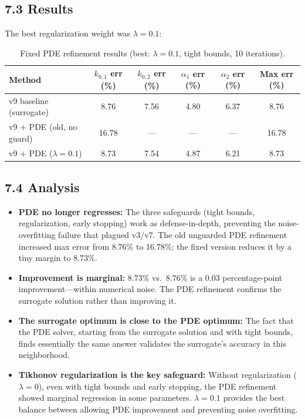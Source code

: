 \documentclass[11pt]{article}
\begin{document}
\subsection*{7.3 Results}

The best regularization weight was $\lambda = 0.1$:

\begin{table}[H]
  \centering
  \caption{Fixed PDE refinement results (best: $\lambda = 0.1$, tight bounds,
           10 iterations).}
  \label{tab:pde_fixed}
  \begin{tabular}{l S[round-precision=2] S[round-precision=2]
                    S[round-precision=2] S[round-precision=2]
                    S[round-precision=2]}
    \toprule
    Method & {$k_{0,1}$ err (\%)} & {$k_{0,2}$ err (\%)}
           & {$\alpha_1$ err (\%)} & {$\alpha_2$ err (\%)}
           & {Max err (\%)} \\
    \midrule
    v9 baseline (surrogate)  &  8.76 &  7.56 & 4.80 & 6.37 &  8.76 \\
    v9 + PDE (old, no guard) & 16.78 & {---} & {---} & {---} & 16.78 \\
    v9 + PDE ($\lambda = 0.1$) &  8.73 &  7.54 & 4.87 & 6.21 &  8.73 \\
    \bottomrule
  \end{tabular}
\end{table}

\subsection*{7.4 Analysis}

\begin{itemize}
  \item \textbf{PDE no longer regresses:} The three safeguards (tight bounds,
        regularization, early stopping) work as defense-in-depth, preventing
        the noise-overfitting failure that plagued v3/v7.  The old unguarded
        PDE refinement increased max error from 8.76\% to 16.78\%; the fixed
        version reduces it by a tiny margin to 8.73\%.

  \item \textbf{Improvement is marginal:} $8.73\%$ vs.\ $8.76\%$ is a
        0.03 percentage-point improvement---within numerical noise.  The PDE
        refinement confirms the surrogate solution rather than improving it.

  \item \textbf{The surrogate optimum is close to the PDE optimum:} The fact
        that the PDE solver, starting from the surrogate solution and with
        tight bounds, finds essentially the same answer validates the
        surrogate's accuracy in this neighborhood.

  \item \textbf{Tikhonov regularization is the key safeguard:} Without
        regularization ($\lambda = 0$), even with tight bounds and early
        stopping, the PDE refinement showed marginal regression in some
        parameters.  $\lambda = 0.1$ provides the best balance between
        allowing PDE improvement and preventing noise overfitting.
\end{itemize}
\end{document}
